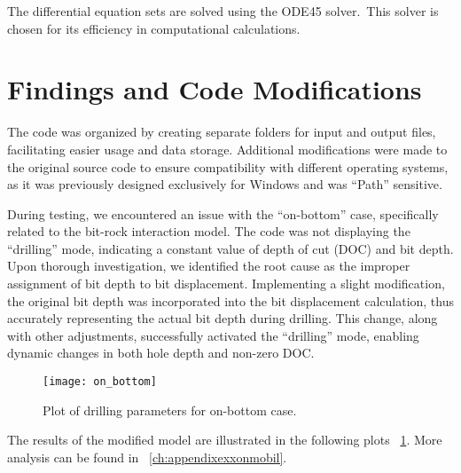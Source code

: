 \begin{mathwhere}[1.0in]
\end{mathwhere}

The differential equation sets are solved using the ODE45 solver.\ This solver is chosen for its efficiency in computational calculations.


\section{Findings and Code Modifications}
 
The code was organized by creating separate folders for input and output files, facilitating easier usage and data storage. Additional modifications were made to the original source code to ensure compatibility with different operating systems, as it was previously designed exclusively for Windows and was ``Path'' sensitive.

During testing, we encountered an issue with the ``on-bottom'' case, specifically related to the bit-rock interaction model. The code was not displaying the ``drilling'' mode, indicating a constant value of depth of cut (DOC) and bit depth. Upon thorough investigation, we identified the root cause as the improper assignment of bit depth to bit displacement. Implementing a slight modification, the original bit depth was incorporated into the bit displacement calculation, thus accurately representing the actual bit depth during drilling. This change, along with other adjustments, successfully activated the ``drilling'' mode, enabling dynamic changes in both hole depth and non-zero DOC.

\begin{figure}
  \centering
  \texttt{[image: on\_bottom]}
  \caption[Plots of on-bottom case]{Plot of drilling parameters for on-bottom case.}\label{findings}
\end{figure}

The results of the modified model are illustrated in the following plots \figurename~\ref{findings}. More analysis can be found in \appendixname~\ref{ch:appendixexxonmobil}. 